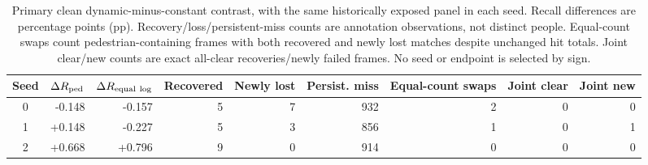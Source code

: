 \begin{table}[t]
\centering
\footnotesize
\setlength{\tabcolsep}{4.0pt}
\caption{Primary clean dynamic-minus-constant contrast, with the same historically exposed panel in each seed. Recall differences are percentage points (pp). Recovery/loss/persistent-miss counts are annotation observations, not distinct people. Equal-count swaps count pedestrian-containing frames with both recovered and newly lost matches despite unchanged hit totals. Joint clear/new counts are exact all-clear recoveries/newly failed frames. No seed or endpoint is selected by sign.}
\label{tab:new_primary_decomposition}
\begin{tabular}{crrrrrrrr}
\toprule
Seed & $\Delta R_{\rm ped}$ & $\Delta R_{\rm equal\ log}$ & Recovered & Newly lost & Persist. miss & Equal-count swaps & Joint clear & Joint new \\
\midrule
0 & -0.148 & -0.157 & 5 & 7 & 932 & 2 & 0 & 0 \\
1 & +0.148 & -0.227 & 5 & 3 & 856 & 1 & 0 & 1 \\
2 & +0.668 & +0.796 & 9 & 0 & 914 & 0 & 0 & 0 \\
\bottomrule
\end{tabular}
\end{table}
